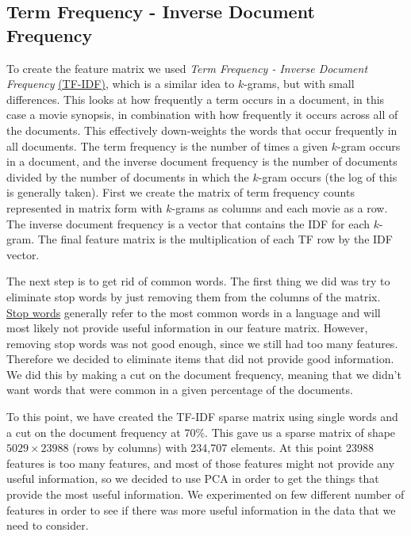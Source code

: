 \documentclass[11pt]{article}
\begin{document}
\subsection{Term Frequency - Inverse Document Frequency}
\label{sec:tfidf}

To create the feature matrix we used {\it Term Frequency - Inverse Document Frequency} \href{https://en.wikipedia.org/wiki/Tf\%E2\%80\%93idf}{(TF-IDF)}, which is a similar idea to $k$-grams, but with small differences.  This looks at how frequently a term occurs in a document, in this case a movie synopsis, in combination with how frequently it occurs across all of the documents. This effectively down-weights the words that occur frequently in all documents. The term frequency is the number of times a given $k$-gram occurs in a document, and the inverse document frequency is the number of documents divided by the number of documents in which the $k$-gram occurs (the log of this is generally taken). First we create the matrix of term frequency counts represented in matrix form with $k$-grams as columns and each movie as a row. The inverse document frequency is a vector that contains the IDF for each $k$-gram. The final feature matrix is the multiplication of each TF row by the IDF vector.

The next step is to get rid of common words. The first thing we did was try to eliminate stop words by just removing them from the columns of the matrix. \href{https://en.wikipedia.org/wiki/Stop_words}{Stop words} generally refer to the most common words in a language and will most likely not provide useful information in our feature matrix. However, removing stop words was not good enough, since we still had too many features.  Therefore we decided to eliminate items that did not provide good information. We did this by making a cut on the document frequency, meaning that we didn't want words that were common in a given percentage of the documents.


To this point, we have created the TF-IDF sparse matrix using single words and a cut on the document frequency at 70\%. This gave us a sparse matrix of shape $5029 \times 23988$ (rows by columns) with 234,707 elements. At this point 23988 features is too many features, and most of those features might not provide any useful information, so we decided to use PCA in order to get the things that provide the most useful information. We experimented on few different number of features in order to see if there was more useful information in the data that we need to consider. 
\end{document}
